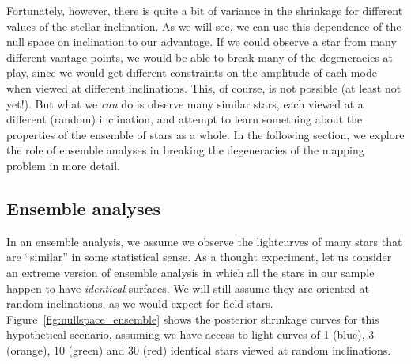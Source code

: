 \documentclass[modern]{aastex62}
\begin{document}
Fortunately, however, there is quite a bit of variance in the shrinkage
for different values of the stellar inclination.
As we will see, we can use this dependence of the null space on inclination to our
advantage. If we could observe a star from many different vantage points,
we would be able to break many of the degeneracies at play, since we
would get different constraints on the amplitude of each mode when viewed
at different inclinations. This, of course, is not possible (at least not
yet!). But what we \emph{can} do is observe many similar stars, each viewed
at a different (random) inclination, and attempt to learn something about
the properties of the ensemble of stars as a whole.
In the
following section, we explore the role of ensemble analyses in breaking
the degeneracies of the mapping problem in more detail.


\subsection{Ensemble analyses}
\label{sec:ensemble}

In an ensemble analysis, we assume we observe the lightcurves of many stars
that are ``similar'' in some statistical sense. As a thought experiment,
let us consider an extreme version of ensemble analysis in which all the
stars in our sample happen to have \emph{identical} surfaces. We will
still assume they are oriented at random inclinations, as we would expect for
field stars.
%
Figure~\ref{fig:nullspace_ensemble} shows the posterior shrinkage
curves for this hypothetical scenario, assuming we have access to
light curves of 1 (blue), 3 (orange), 10 (green) and 30 (red)
identical stars viewed at random inclinations.
\end{document}
